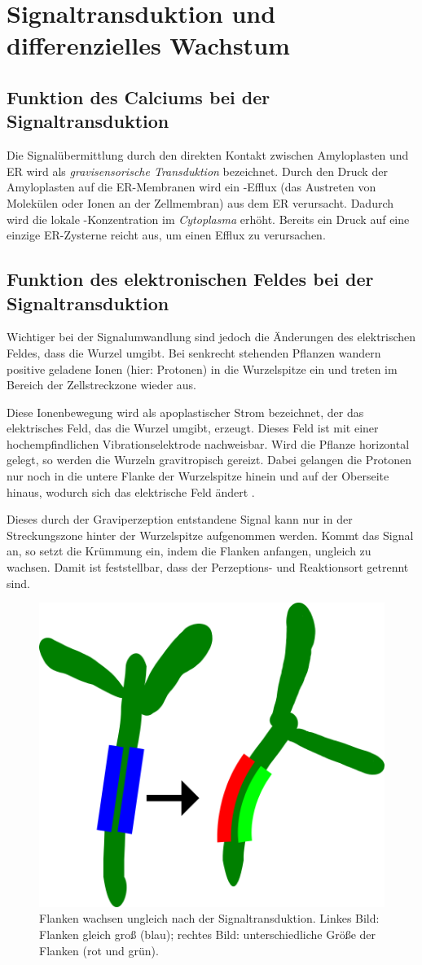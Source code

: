 \documentclass[
11pt, 
ngerman,
listof=totocnumbered,
oneside,
bibliography=totocnumbered,
abstracton
]{scrreprt}
\begin{document}
\section{Signaltransduktion und differenzielles Wachstum}

\subsection{Funktion des Calciums bei der Signaltransduktion}

Die Signalübermittlung durch den direkten Kontakt zwischen Amyloplasten und ER wird als \emph{gravisensorische Transduktion} bezeichnet.
Durch den Druck der Amyloplasten auf die ER-Membranen wird ein -Efflux (das Austreten von Molekülen oder Ionen an der Zellmembran) aus dem ER verursacht.
Dadurch wird die lokale -Konzentration im  \emph{Cytoplasma} erhöht. 
Bereits ein Druck auf eine einzige ER-Zysterne reicht aus, um einen Efflux zu verursachen.

\subsection{Funktion des elektronischen Feldes bei der Signaltransduktion}

Wichtiger bei der Signalumwandlung sind jedoch die Änderungen des elektrischen Feldes, dass die Wurzel umgibt.
Bei senkrecht stehenden Pflanzen wandern positive geladene Ionen (hier: Protonen) in die Wurzelspitze ein und treten im Bereich der Zellstreckzone wieder aus.

Diese Ionenbewegung wird als apoplastischer Strom bezeichnet, der das elektrisches Feld, das die Wurzel umgibt, erzeugt. Dieses Feld ist mit einer hochempfindlichen Vibrationselektrode nachweisbar. 
Wird die Pflanze horizontal gelegt, so werden die Wurzeln gravitropisch gereizt. Dabei gelangen die Protonen nur noch in die untere Flanke der Wurzelspitze hinein und auf der Oberseite hinaus, wodurch sich das elektrische Feld ändert \parencite[502--503]{Nultsch}.

Dieses durch der Graviperzeption entstandene Signal kann nur in der Streckungszone hinter der Wurzelspitze aufgenommen werden. Kommt das Signal an, so setzt die Krümmung ein, indem die Flanken anfangen, ungleich zu wachsen. Damit ist feststellbar, dass der Perzeptions- und Reaktionsort getrennt sind.

\begin{figure}[H]
	\centering 
	\includegraphics[width = 0.4\linewidth]{images/diff.png}
	\caption{Flanken wachsen ungleich nach der Signaltransduktion. Linkes Bild: Flanken gleich groß (blau); rechtes Bild: unterschiedliche Größe der Flanken (rot und grün).}
\end{figure} 
\end{document}
